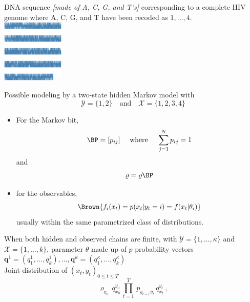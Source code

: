 \begin{slide}
\end{slide}\begin{slide}

DNA sequence {\em [made of A, C, G, and T's]} corresponding to a complete HIV
genome where A, C, G, and T have been recoded as $1,...,4$.\\


\includegraphics[height=3cm,width=\textwidth]{figures/dna.eps}

\pause
Possible modeling by a two-state hidden Markov model with 
$$
\mathscr{Y}=\{1,2\} \quad\text{and}\quad \mathscr{X}=\{1,2,3,4\}
$$

\end{slide}\begin{slide}

\begin{itemize}
\item For the  Markov bit, 
$$
\BP = [p_{ij}]\quad\hbox{ where }\quad\sum_{j=1}^{N} p_{ij} = 1
$$
and
$$
\varrho = \varrho \BP
$$
  
\item for the observables, 
$$\Brown{
f_i(x_t) = p(x_{t} | y_{t} = i) = f(x_t|\theta_i)
}$$
usually within the same parametrized class of distributions.
\end{itemize}

\end{slide}\begin{slide}

When both hidden and observed chains are
finite, with $\mathscr{Y}=\{1,\ldots,\kappa\}$ and
$\mathscr{X}=\{1,\ldots,k\}$, parameter
$\theta$ made up of $p$ probability vectors
$\mathbf{q}^1=(q^1_1,\ldots\allowbreak,q^1_k),\ldots\allowbreak,
\mathbf{q}^\kappa=(q^\kappa_1,\ldots\allowbreak,q^\kappa_k)$\\

\pause
Joint distribution of $(x_t,y_t)_{0\le t\le T}$ 
$$
\varrho_{y_0}\,q^{y_0}_{x_0}\,\prod_{t=1}^T\, p_{y_{t-1}y_t}\, q^{y_t}_{x_t}\,,
$$

\end{slide}\begin{slide}


\end{slide}
